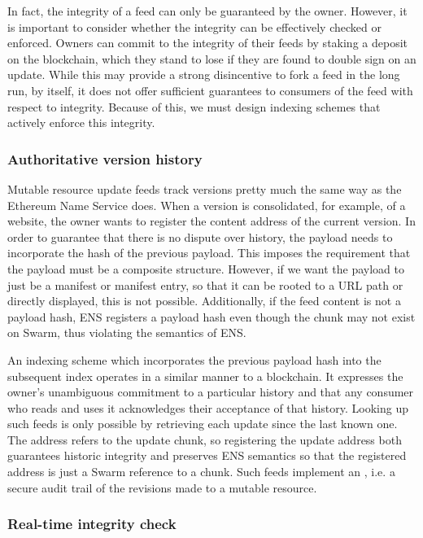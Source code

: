 In fact, the integrity of a feed can only be guaranteed by the owner. However, it is important to consider whether the integrity can be effectively checked or enforced. Owners can commit to the integrity of their feeds by staking a deposit on the blockchain, which they stand to lose if they are found to double sign on an update. While this may provide a strong disincentive to fork a feed in the long run, by itself, it does not offer sufficient guarantees to consumers of the feed with respect to integrity. Because of this, we must design indexing schemes that actively enforce this integrity.

\subsubsection{Authoritative version history}

Mutable resource update feeds track versions pretty much the same way as the Ethereum Name Service does.  
When a version is consolidated, for example, of a website, the owner wants to register the content address of the current version. In order to guarantee that there is no dispute over history, the payload needs to incorporate the hash of the previous payload. This imposes the requirement that the payload must be a composite structure. However, if we want the payload to just be a manifest or manifest entry, so that it can be rooted to a URL path or directly displayed, this is not possible. Additionally, if the feed content is not a payload hash, ENS registers a payload hash even though the chunk may not exist on Swarm, thus violating the semantics of ENS.

An indexing scheme which incorporates the previous payload hash into the subsequent index operates in a similar manner to a blockchain. It expresses the owner's unambiguous commitment to a particular history and that any consumer who reads and uses it acknowledges their acceptance of that history. 
Looking up such feeds is only possible by retrieving each update since the last known one. The address refers to the update chunk, so registering the update address both guarantees historic integrity and preserves ENS semantics so that the registered address is just a Swarm reference to a chunk.
Such feeds implement an , i.e. a secure audit trail of the revisions made to a mutable resource. 

\subsubsection{Real-time integrity check}

